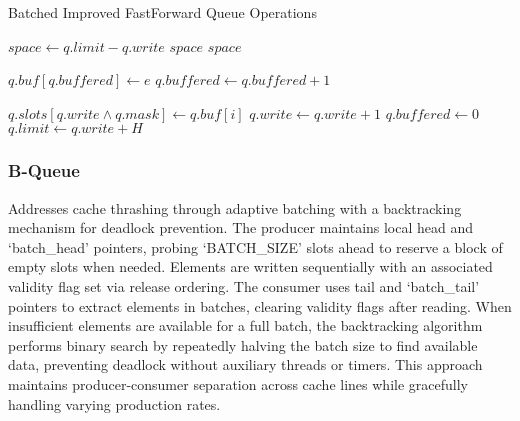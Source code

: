 \begin{algorithm}[!ht]
   \centering
   \captionsetup{justification=centering}
   \caption{Batched Improved FastForward Queue Operations \cite{MaffioneCacheAware}}
   \label{alg:biffq}
   \scriptsize
   \begin{algorithmic}[1]
           \State $space \gets q.limit - q.write$
               \State \Return $space$ 
           \EndIf
           \State \Return $space$
       \EndFunction
       
       \State
       
           \State $q.buf[q.buffered] \gets e$ 
           \State $q.buffered \gets q.buffered + 1$
       \EndFunction
       
       \State
       
               \State $q.slots[q.write \land q.mask] \gets q.buf[i]$ 
               \State $q.write \gets q.write + 1$
           \EndFor
           \State $q.buffered \gets 0$
           \State $q.limit \gets q.write + H$ 
       \EndFunction
   \end{algorithmic}
\end{algorithm}

\subsubsection{B-Queue}
Addresses cache thrashing through adaptive batching with a backtracking mechanism for deadlock prevention. The producer maintains local head and \enquote*{batch\_head} pointers, probing \enquote*{BATCH\_SIZE} slots ahead to reserve a block of empty slots when needed. Elements are written sequentially with an associated validity flag set via release ordering. The consumer uses tail and \enquote*{batch\_tail} pointers to extract elements in batches, clearing validity flags after reading. When insufficient elements are available for a full batch, the backtracking algorithm performs binary search by repeatedly halving the batch size to find available data, preventing deadlock without auxiliary threads or timers. This approach maintains producer-consumer separation across cache lines while gracefully handling varying production rates. \cite{Wang2013BQueue}

